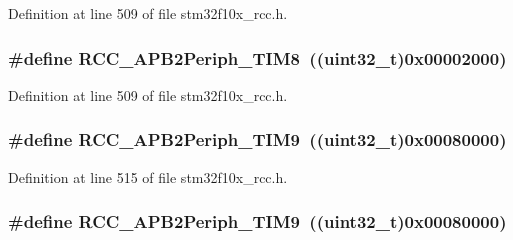 Definition at line 509 of file stm32f10x\+\_\+rcc.\+h.

\subsubsection[{\texorpdfstring{R\+C\+C\+\_\+\+A\+P\+B2\+Periph\+\_\+\+T\+I\+M8}{RCC_APB2Periph_TIM8}}]{\setlength{\rightskip}{0pt plus 5cm}\#define R\+C\+C\+\_\+\+A\+P\+B2\+Periph\+\_\+\+T\+I\+M8~(({\bf uint32\+\_\+t})0x00002000)}\hypertarget{group___a_p_b2__peripheral_gac951d41a08140a7d38a4faff8dd1e03e}{}\label{group___a_p_b2__peripheral_gac951d41a08140a7d38a4faff8dd1e03e}


Definition at line 509 of file stm32f10x\+\_\+rcc.\+h.

\subsubsection[{\texorpdfstring{R\+C\+C\+\_\+\+A\+P\+B2\+Periph\+\_\+\+T\+I\+M9}{RCC_APB2Periph_TIM9}}]{\setlength{\rightskip}{0pt plus 5cm}\#define R\+C\+C\+\_\+\+A\+P\+B2\+Periph\+\_\+\+T\+I\+M9~(({\bf uint32\+\_\+t})0x00080000)}\hypertarget{group___a_p_b2__peripheral_ga24d0145dc172bc27ed580770cf15e4d9}{}\label{group___a_p_b2__peripheral_ga24d0145dc172bc27ed580770cf15e4d9}


Definition at line 515 of file stm32f10x\+\_\+rcc.\+h.

\subsubsection[{\texorpdfstring{R\+C\+C\+\_\+\+A\+P\+B2\+Periph\+\_\+\+T\+I\+M9}{RCC_APB2Periph_TIM9}}]{\setlength{\rightskip}{0pt plus 5cm}\#define R\+C\+C\+\_\+\+A\+P\+B2\+Periph\+\_\+\+T\+I\+M9~(({\bf uint32\+\_\+t})0x00080000)}\hypertarget{group___a_p_b2__peripheral_ga24d0145dc172bc27ed580770cf15e4d9}{}\label{group___a_p_b2__peripheral_ga24d0145dc172bc27ed580770cf15e4d9}


